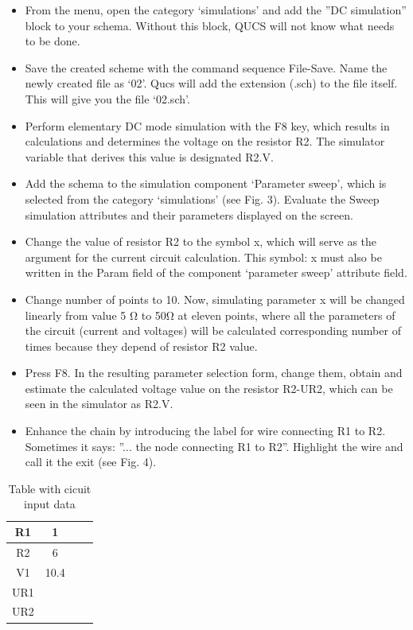 \documentclass{report}
\begin{document}
\begin{itemize}
\item From the menu, open the category ‘simulations’ and add the ”DC simulation” block to
your schema. Without this block, QUCS will not know what needs to be done.
\item Save the created scheme with the command sequence File-Save. Name the newly created
file as ‘02’. Qucs will add the extension (.sch) to the file itself. This will give you the
file ‘02.sch’.
\item Perform elementary DC mode simulation with the F8 key, which results in calculations
and determines the voltage on the resistor R2. The simulator variable that derives this
value is designated R2.V.
\item Add the schema to the simulation component ‘Parameter sweep’, which is selected from
the category ‘simulations’ (see Fig. 3). Evaluate the Sweep simulation attributes and
their parameters displayed on the screen.

\item Change the value of resistor R2 to the symbol x, which will serve as the argument for the
current circuit calculation. This symbol: x must also be written in the Param field of the
component ‘parameter sweep’ attribute field.
\item Change number of points to 10. Now, simulating parameter x will be changed linearly
from value 5 Ω to 50Ω at eleven points, where all the parameters of the circuit (current
and voltages) will be calculated corresponding number of times because they depend of
resistor R2 value.
\item Press F8. In the resulting parameter selection form, change them, obtain and estimate
the calculated voltage value on the resistor R2-UR2, which can be seen in the simulator
as R2.V.
\item Enhance the chain by introducing the label for wire connecting R1 to R2. Sometimes it
says: ”... the node connecting R1 to R2”. Highlight the wire and call it the exit (see Fig.
4).

 \end{itemize}

\begin{table}[!tb]
    \begin{center}
        \begin{tabular}{ |c|c|c|c| } 
            \hline
            R1  & 1 \\ 
            \hline
            R2 & 6 \\ 
            \hline
            V1 & 10.4 \\ 
            \hline
            UR1 & \\ 
            \hline
            UR2 & \\ 
            \hline
        \end{tabular}
        \caption{Table with cicuit input data}
    \end{center}
\end{table}
\end{document}

